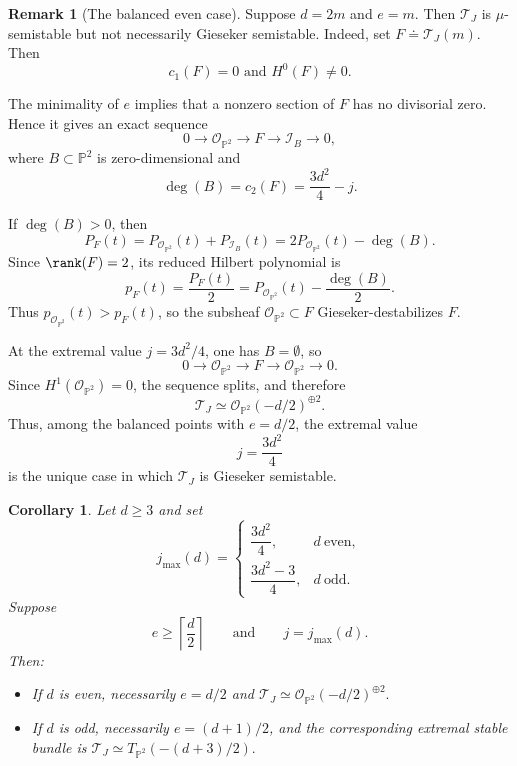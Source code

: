 \documentclass[11pt]{amsart} %
\newtheorem{Corollary}[Theorem]{Corollary}
\theoremstyle{definition}
\newtheorem{Remark}[Theorem]{Remark}
\def\NZQ{\mathbb}               %
\def\PP{{\NZQ P}}
\def\T{{\mathcal T}}
\begin{document}
\begin{Remark}[The balanced even case]
\label{rmk:balanced-gieseker}
Suppose \(
d=2m\) and \(e=m\). Then $\T_J$ is $\mu$-semistable but not necessarily Gieseker semistable. Indeed, set \(
F\doteq\T_J(m)\). Then
\[
c_1(F)=0 \text{ and }H^0(F)\neq0.
\]

The minimality of $e$ implies that a nonzero section of $F$ has no
divisorial zero. Hence it gives an exact sequence
\[
0
\longrightarrow
\mathcal O_{\PP^2}
\longrightarrow
F
\longrightarrow
\mathcal I_B
\longrightarrow0,
\]
where $B\subset\PP^2$ is zero-dimensional and
\[
\deg(B)
=
c_2(F)
=
\frac{3d^2}{4}-j.
\]

If $\deg(B)>0$, then
\[
P_F(t)
=
P_{\mathcal O_{\PP^2}}(t)
+
P_{\mathcal I_B}(t)
=
2P_{\mathcal O_{\PP^2}}(t)-\deg(B).
\]
Since $\rank(F)=2$, its reduced Hilbert polynomial is
\[
p_F(t)
=
\frac{P_F(t)}2
=
P_{\mathcal O_{\PP^2}}(t)
-\frac{\deg(B)}2.
\]
Thus
\(
p_{\mathcal O_{\PP^2}}(t)>p_F(t)\), so the subsheaf
\(\mathcal O_{\PP^2}\subset F\) Gieseker-destabilizes $F$.

At the extremal value \(
j=3d^2/4\), one has $B=\emptyset$, so
\[
0
\longrightarrow
\mathcal O_{\PP^2}
\longrightarrow
F
\longrightarrow
\mathcal O_{\PP^2}
\longrightarrow0.
\]
Since \(H^1(\mathcal O_{\PP^2})=0\),
the sequence splits, and therefore
\[
\T_J
\simeq
\mathcal O_{\PP^2}(-d/2)^{\oplus2}.
\]
Thus, among the balanced points with \(e=d/2\), the extremal value
\[
j=\frac{3d^2}{4}
\]
is the unique case in which $\T_J$ is Gieseker semistable.
\end{Remark}

\begin{Corollary}\label{cor:exceptional-sheaves}
Let $d\geq3$ and set
\[
j_{\max}(d)
=
\begin{cases}
\dfrac{3d^2}{4},
& d\ \mathrm{even},\\[2mm]
\dfrac{3d^2-3}{4},
& d\ \mathrm{odd}.
\end{cases}
\]
Suppose
\[
e\geq\left\lceil\frac d2\right\rceil
\qquad\text{and}\qquad
j=j_{\max}(d).
\]
Then:

\begin{itemize}
    \item[(a)] If $d$ is even, necessarily \(
    e=d/2\) and \(\T_J
    \simeq
    \mathcal O_{\PP^2}(-d/2)^{\oplus2}.
    \)

    \item[(b)] If $d$ is odd, necessarily \(
    e=(d+1)/2\), and the corresponding extremal stable bundle is \(
    \T_J
    \simeq
    T_{\PP^2}\left(-(d+3)/2\right).
    \)
\end{itemize}
\end{Corollary}
\end{document}
